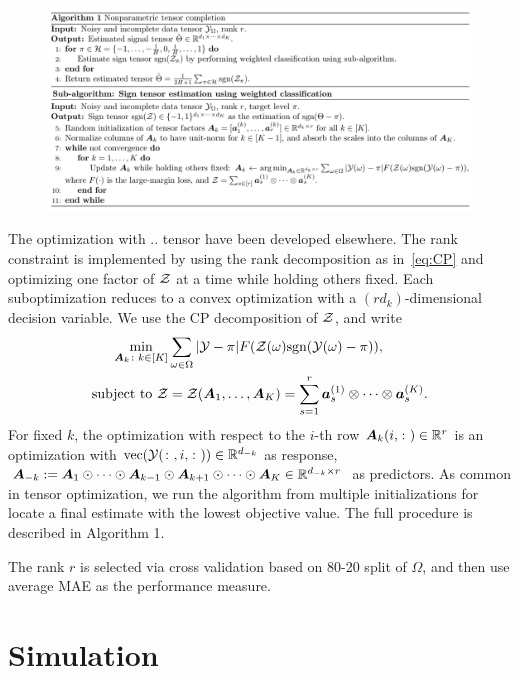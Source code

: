 \documentclass{article}
\theoremstyle{plain}
\theoremstyle{definition}
\def\sign{\textup{sgn}}
\begin{document}
\begin{figure}[h]
\includegraphics[width=\textwidth]{algorithm.pdf}
\end{figure}


The optimization with .. tensor have been developed elsewhere. The rank constraint is implemented by using the rank decomposition as in~\eqref{eq:CP} and optimizing one factor of $\mathcal{Z}$ at a time while holding others fixed. Each suboptimization reduces to a convex optimization with a $(rd_k)$-dimensional decision variable. 
We use the CP decomposition of $\mathcal{Z}$, and write 
\begin{align}
\min_{\mA_k\colon k\in[K]}&\sum_{\omega\in \Omega}|\tY-\pi|F(\tZ(\omega)\sign(\tY(\omega)-\pi)),\\
\text{subject to }\tZ&=\tZ(\mA_1,\ldots,\mA_K)=\sum_{s=1}^r\ma^{(1)}_s\otimes \cdots \otimes \ma^{(K)}_s.
\end{align}
For fixed $k$, the optimization with respect to the $i$-th row $\bm A_k(i,\colon)\in\mathbb{R}^{r}$ is an optimization with $\text{vec}(\mathcal{Y}(\colon,i,\colon))\in\mathbb{R}^{d_{-k}}$ as response, $\bm A_{-k}:=\bm A_1\odot \cdots \odot \bm A_{k-1}\odot \bm A_{k+1}\odot \cdots \odot \bm A_K \in\mathbb{R}^{d_{-k}\times r}$ as predictors. 
As common in tensor optimization, we run the algorithm from multiple initializations for locate a final estimate with the lowest objective value. The full procedure is described in Algorithm 1.

The rank $r$ is selected via cross validation based on 80-20 split of $\Omega$, and then use average MAE as the performance measure. 

\section{Simulation}
\end{document}
